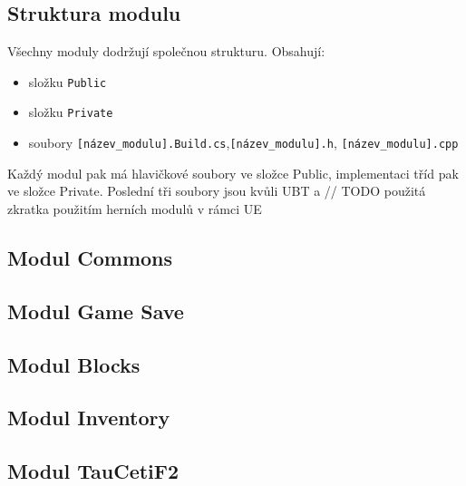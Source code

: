 \subsection{Struktura modulu}
Všechny moduly dodržují společnou strukturu. Obsahují:
\begin{itemize}
	\item složku \verb!Public!
	\item složku \verb!Private!
	\item soubory \verb![název_modulu].Build.cs!,\verb![název_modulu].h!, \verb![název_modulu].cpp!
\end{itemize}


Každý modul pak má hlavičkové soubory ve složce Public, implementaci tříd pak ve složce Private. Poslední tři soubory jsou kvůli UBT a // TODO použitá zkratka 
použitím herních modulů v rámci UE



\subsection{Modul Commons}



\subsection{Modul Game Save}



\subsection{Modul Blocks}



\subsection{Modul Inventory}



\subsection{Modul TauCetiF2}




